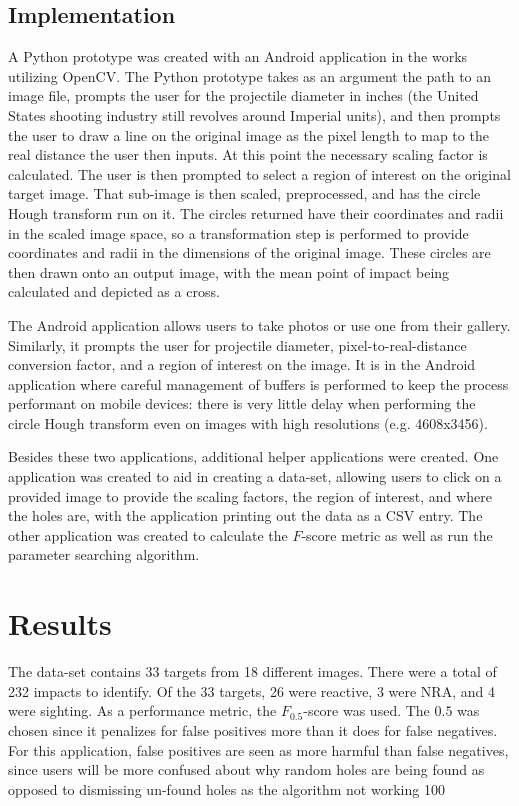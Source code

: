 \documentclass{article}
\begin{document}
\subsection{Implementation}
\label{ssec:implementation}

A Python prototype was created with an Android application in the works utilizing OpenCV.
The Python prototype takes as an argument the path to an image file, prompts
the user for the projectile diameter in inches (the United States shooting industry
still revolves around Imperial units), and then prompts the user to draw a line
on the original image as the pixel length to map to the real distance the user then inputs.
At this point the necessary scaling factor is calculated.
The user is then prompted to select a region of interest on the original target image.
That sub-image is then scaled, preprocessed, and has the circle Hough transform run on it.
The circles returned have their coordinates and radii in the scaled image space, so a
transformation step is performed to provide coordinates and radii in the dimensions of
the original image. These circles are then drawn onto an output image, with the mean
point of impact being calculated and depicted as a cross.

The Android application allows users to take photos or use one from their gallery. Similarly,
it prompts the user for projectile diameter, pixel-to-real-distance conversion factor, and
a region of interest on the image. It is in the Android application where careful management
of buffers is performed to keep the process performant on mobile devices:
there is very little delay when performing the circle Hough transform even on
images with high resolutions (e.g. 4608x3456).

Besides these two applications, additional helper applications were created. One application
was created to aid in creating a data-set, allowing users to click on a provided image
to provide the scaling factors, the region of interest, and where the holes are, with the application
printing out the data as a CSV entry. The other application was created to calculate the \(F\)-score
metric as well as run the parameter searching algorithm.

\section{Results}
\label{sec:results}

The data-set contains 33 targets from 18 different images. There were a total of 232 impacts
to identify. Of the 33 targets, 26 were reactive, 3 were NRA, and 4 were sighting.
As a performance metric, the \(F_{0.5}\)-score was used. The \(0.5\) was chosen
since it penalizes for false positives more than it does for false negatives.
For this application, false positives are seen as more harmful than false negatives, since users
will be more confused about why random holes are being found as opposed to dismissing un-found
holes as the algorithm not working 100%
\end{document}
